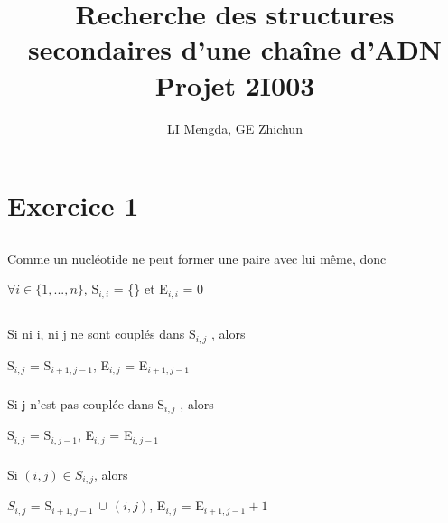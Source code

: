 \documentclass[french]{article}
\title{Recherche des structures secondaires d’une chaîne d’ADN\\
\large Projet 2I003}
\author{LI Mengda, GE Zhichun}
\begin{document}
\lstset{language=Python}	

\maketitle

\section{Exercice 1}

\subsection{}
\label{subsec:q1}
Comme un nucléotide ne peut former une paire avec lui même, donc 

\begin{center}
$\forall i\in\{1,...,n\}$, \quad S$_{i,i}$ = \{\} et E$_{i,i}$ = 0
\par\end{center}

\subsection{}
\label{subsec:q2}

	\subsubsection{}
	Si ni i, ni j ne sont couplés dans S$_{i,j}$ , alors
	\begin{center}
	S$_{i,j}$ = S$_{i+1,j-1}$, \quad E$_{i,j}$ = E$_{i+1,j-1}$
	\par\end{center}

	\subsubsection{}
	Si j n'est pas couplée dans S$_{i,j}$ , alors
	\begin{center}
	S$_{i,j}$ = S$_{i,j-1}$,  \quad E$_{i,j}$ = E$_{i,j-1}$
	\par\end{center}

	\subsubsection{}
	Si $\left(i,j\right)\in S_{i,j}$, alors
	\begin{center}
	$S_{i,j} $  = S$_{i+1,j-1}\, \cup \, \left(i,j\right)$, \quad  E$_{i,j}$  = E$_{i+1,j-1}+ 1$
	\par\end{center}
\end{document}

